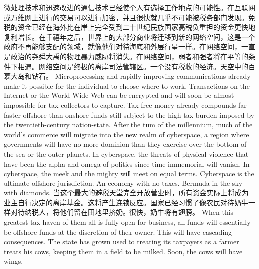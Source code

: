 \begin{paracol}{2}[]
\switchcolumn*
微处理技术和迅速改进的通信技术已经使个人有选择工作地点的可能性。在互联网或万维网上进行的交易可以进行加密，并且很快就几乎不可能被税务部门发现。免税的资金已经在海外比在岸上完全受到二十世纪民族国家高税负重担的资金更快地复利增长。在千禧年之后，世界上的大部分商业将迁移到新的网络空间，这是一个政府不再能够支配的领域，就像他们对待海底和外层行星一样。在网络空间，一直是政治的尧舜大禹的物理暴力威胁将消失。在网络空间，弱者和强者将在平等的条件下相遇。网络空间是终极的离岸司法管辖区。一个没有税收的经济。天空中的百慕大岛和钻石。
\switchcolumn
Microprocessing and rapidly improving communications already make it possible for the individual to choose where to work. Transactions on the Internet or the World Wide Web can be encrypted and will soon be almost impossible for tax collectors to capture. Tax-free money already compounds far faster offshore than onshore funds still subject to the high tax burden imposed by the twentieth-century nation-state. After the tum of the millennium, much of the world's commerce will migrate into the new realm of cyberspace, a region where governments will have no more dominion than they exercise over the bottom of the sea or the outer planets. In cyberspace, the threats of physical violence that have been the alpha and omega of politics since time immemorial will vanish. In cyberspace, the meek and the mighty will meet on equal terms. Cyberspace is the ultimate offshore jurisdiction. An economy with no taxes. Bermuda in the sky with diamonds.
\switchcolumn*
当这个最大的避税天堂完全开放营业时，所有资金实际上将成为业主自行决定的离岸基金。这将产生连锁反应。国家已经习惯了像农民对待奶牛一样对待纳税人，将他们留在田地里挤奶。很快，奶牛将有翅膀。
\switchcolumn
When this greatest tax haven of them all is fully open for business, all funds will essentially be offshore funds at the discretion of their owner. This will have cascading consequences. The state has grown used to treating its taxpayers as a farmer treats his cows, keeping them in a field to be milked. Soon, the cows will have wings.
\end{paracol}

